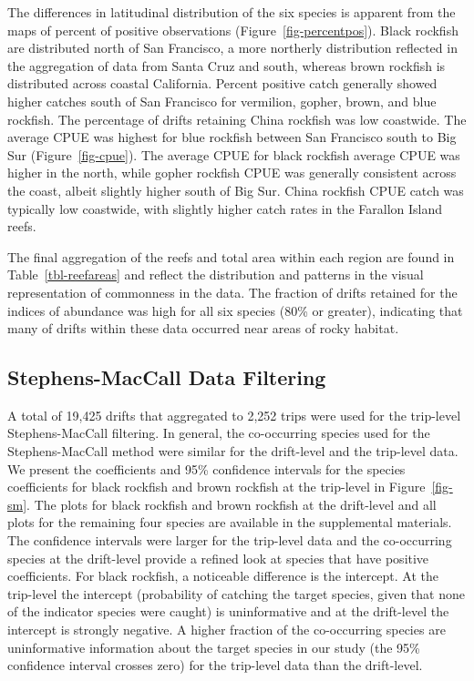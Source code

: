 \documentclass[
  12pt,
  authoryear,
  preprint,
  3p]{elsarticle}
\begin{document}
The differences in latitudinal distribution of the six species is
apparent from the maps of percent of positive observations
(Figure~\ref{fig-percentpos}). Black rockfish are distributed north of
San Francisco, a more northerly distribution reflected in the
aggregation of data from Santa Cruz and south, whereas brown rockfish is
distributed across coastal California. Percent positive catch generally
showed higher catches south of San Francisco for vermilion, gopher,
brown, and blue rockfish. The percentage of drifts retaining China
rockfish was low coastwide. The average CPUE was highest for blue
rockfish between San Francisco south to Big Sur (Figure~\ref{fig-cpue}).
The average CPUE for black rockfish average CPUE was higher in the
north, while gopher rockfish CPUE was generally consistent across the
coast, albeit slightly higher south of Big Sur. China rockfish CPUE
catch was typically low coastwide, with slightly higher catch rates in
the Farallon Island reefs.

The final aggregation of the reefs and total area within each region are
found in Table~\ref{tbl-reefareas} and reflect the distribution and
patterns in the visual representation of commonness in the data. The
fraction of drifts retained for the indices of abundance was high for
all six species (80\% or greater), indicating that many of drifts within
these data occurred near areas of rocky habitat.

\hypertarget{stephens-maccall-data-filtering-1}{%
\subsection{Stephens-MacCall Data
Filtering}\label{stephens-maccall-data-filtering-1}}

A total of 19,425 drifts that aggregated to 2,252 trips were used for
the trip-level Stephens-MacCall filtering. In general, the co-occurring
species used for the Stephens-MacCall method were similar for the
drift-level and the trip-level data. We present the coefficients and
95\% confidence intervals for the species coefficients for black
rockfish and brown rockfish at the trip-level in Figure~\ref{fig-sm}.
The plots for black rockfish and brown rockfish at the drift-level and
all plots for the remaining four species are available in the
supplemental materials. The confidence intervals were larger for the
trip-level data and the co-occurring species at the drift-level provide
a refined look at species that have positive coefficients. For black
rockfish, a noticeable difference is the intercept. At the trip-level
the intercept (probability of catching the target species, given that
none of the indicator species were caught) is uninformative and at the
drift-level the intercept is strongly negative. A higher fraction of the
co-occurring species are uninformative information about the target
species in our study (the 95\% confidence interval crosses zero) for the
trip-level data than the drift-level.
\end{document}
